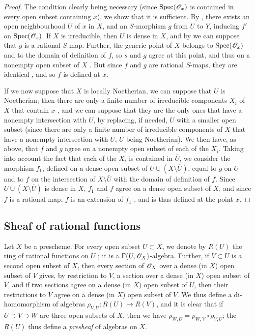 \begin{proof}
\label{proof-1.7.2.9}
The condition clearly being necessary (since ${\mathop{\mathrm{Spec}}\nolimits}(\mathscr{O}_x)$ is contained in every open subset containing $x$), we show that it is sufficient.
By , there exists an open neighbourhood $U$ of $x$ in $X$, and an $S$-morphism $g$ from $U$ to $Y$, inducing $f'$ on ${\mathop{\mathrm{Spec}}\nolimits}(\mathscr{O}_x)$.
If $X$ is irreducible, then $U$ is dense in $X$, and by  we can suppose that $g$ is a rational $S$-map.
Further, the generic point of $X$ belongs to ${\mathop{\mathrm{Spec}}\nolimits}(\mathscr{O}_x)$ and to the domain of definition of $f$, so $s$ and $g$ agree at this point, and thus on a nonempty open subset of $X$ .
But since $f$ and $g$ are rational $S$-maps, they are identical , and so $f$ is defined at $x$.

If we now suppose that $X$ is locally Noetherian, we can suppose that $U$ is Noetherian; then there are only a finite number of irreducible components $X_i$ of $X$ that contain $x$ , and we can suppose that they are the only ones that have a nonempty intersection with $U$, by replacing, if needed, $U$ with a smaller open subset (since there are only a finite number of irreducible components of $X$ that have a nonempty intersection with $U$, $U$ being Noetherian).
We then have, as above, that $f$ and $g$ agree on a nonempty open subset of each of the $X_i$.
Taking into account the fact that each of the $X_i$ is contained in $\overline{U}$, we consider the morphism $f_1$, defined on a dense open subset of $U\cup(X\setminus\overline{U})$, equal to $g$ on $U$ and to $f$ on the intersection of $X\setminus\overline{U}$ with the domain of definition of $f$.
Since $U\cup(X\setminus\overline{U})$ is dense in $X$, $f_1$ and $f$ agree on a dense open subset of $X$, and since $f$ is a rational map, $f$ is an extension of $f_1$ , and is thus defined at the point $x$.
\end{proof}

\subsection{Sheaf of rational functions}
\label{subsection-sheaf-of-rational-functions}

\begin{env}[7.3.1]
\label{1.7.3.1}
Let $X$ be a prescheme.
For every open subset $U\subset X$, we denote by $R(U)$ the ring of rational functions on $U$ ; it is a $\Gamma(U,\mathscr{O}_X)$-algebra.
Further, if $V\subset U$ is a second open subset of $X$, then every section of $\mathscr{O}_X$ over a dense (in $X$) open subset of $V$ gives, by restriction to $V$, a section over a dense (in $X$) open subset of $V$, and if two sections agree on a dense (in $X$) open subset of $U$, then their restrictions to $V$ agree on a dense (in $X$) open subset of $V$.
We thus define a di-homomorphism of algebras $\rho_{V,U}:R(U)\to R(V)$, and it is clear that if $U\supset V\supset W$ are three open subsets of $X$, then we have $\rho_{W,U}=\rho_{W,V}\circ\rho_{V,U}$; the $R(U)$ thus define a \emph{presheaf} of algebras on $X$.
\end{env}

